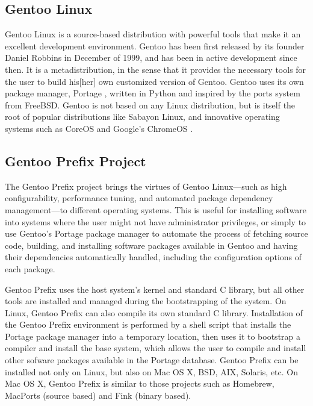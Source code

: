 \documentclass[a4paper,conference]{IEEEtran}
\begin{document}
\subsection{Gentoo Linux}

Gentoo Linux \cite{gentoo} is a source-based distribution with powerful
tools that make it an excellent development environment. Gentoo has been
first released by its founder Daniel Robbins in December of 1999, and
has been in active development since then. It is a metadistribution, in
the sense that it provides the necessary tools for the user to build
his[her] own customized version of Gentoo. Gentoo uses its own package
manager, Portage \cite{gentoo:portage}, written in Python and inspired
by the ports system from FreeBSD. Gentoo is not based on any Linux
distribution, but is itself the root of popular distributions like
Sabayon Linux, and innovative operating systems such as
CoreOS \cite{coreos} and Google's ChromeOS \cite{chromiumos}.

\subsection{Gentoo Prefix Project}

The Gentoo Prefix project \cite{gentoo:prefix} brings the virtues of
Gentoo Linux---such as high configurability, performance tuning, and
automated package dependency management---to different operating
systems. This is useful for installing software into systems where the
user might not have administrator privileges, or simply to use Gentoo's
Portage package manager to automate the process of fetching source code,
building, and installing software packages available in Gentoo and
having their dependencies automatically handled, including the
configuration options of each package.

Gentoo Prefix uses the host system's kernel and standard C library, but
all other tools are installed and managed during the bootstrapping of
the system. On Linux, Gentoo Prefix can also compile its own standard C library.
Installation of the Gentoo
Prefix environment is performed by a shell script that installs the
Portage package manager into a temporary location, then uses it to
bootstrap a compiler and install the base system, which allows the user
to compile and install other sofware packages available in the Portage
database. Gentoo Prefix can be installed not only on Linux, but also on
Mac OS X, BSD, AIX, Solaris, etc.  On Mac OS X, Gentoo Prefix is similar to those
projects such as Homebrew, MacPorts (source based) and Fink (binary based).
\end{document}
